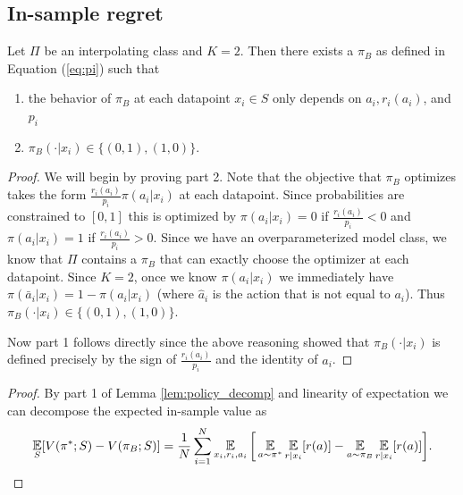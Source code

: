\begin{subappendices}
\label{app:pb}


\subsection{In-sample regret}



\begin{lemma}\label{lem:policy_decomp}
Let $ \Pi$ be an interpolating class and $ K = 2$. Then there exists a $ \pi_B $ as defined in Equation (\ref{eq:pi}) such that
\begin{enumerate}
    \item the behavior of $ \pi_B$ at each datapoint $ x_i \in S$ only depends on $ a_i, r_i(a_i)$, and $ p_i$
    \item $ \pi_B(\cdot|x_i) \in \{(0,1),(1,0)\}$.
\end{enumerate}
\end{lemma}
\begin{proof}
We will begin by proving part 2. Note that the objective that $ \pi_B$ optimizes takes the form $ \frac{r_i(a_i)}{p_i}\pi(a_i|x_i)$ at each datapoint. Since probabilities are constrained to $[0,1]$ this is optimized by $ \pi(a_i|x_i) = 0$ if $ \frac{r_i(a_i)}{p_i} < 0$ and $ \pi(a_i|x_i) = 1$ if $ \frac{r_i(a_i)}{p_i} > 0$. Since we have an overparameterized model class, we know that $ \Pi$ contains a $ \pi_B$ that can exactly choose the optimizer at each datapoint. Since $ K=2$, once we know $ \pi(a_i|x_i)$ we immediately have $ \pi(\bar a_i|x_i) = 1 - \pi(a_i|x_i)$ (where $ \hat a_i$ is the action that is not equal to $ a_i$). Thus $ \pi_B(\cdot|x_i) \in \{(0,1),(1,0)\}$.

Now part 1 follows directly since the above reasoning showed that $ \pi_B(\cdot|x_i)$ is defined precisely by the sign of $ \frac{r_i(a_i)}{p_i}$ and the identity of $ a_i$.
\end{proof}



\vsthm*

\begin{proof}
By part 1 of Lemma \ref{lem:policy_decomp} and linearity of expectation we can decompose the expected in-sample value as
\begin{align*}
    \E_{S}[V(\pi^*;S) - V(\pi_B;S)] = \frac{1}{N}\sum_{i=1}^N \E_{x_i, r_i, a_i}\bigg[ \E_{a\sim \pi^*}\E_{r|x_i}[r(a)] -  \E_{a\sim \pi_B}\E_{r|x_i}[r(a)]\bigg].
\end{align*}


\end{proof}
\end{subappendices}

